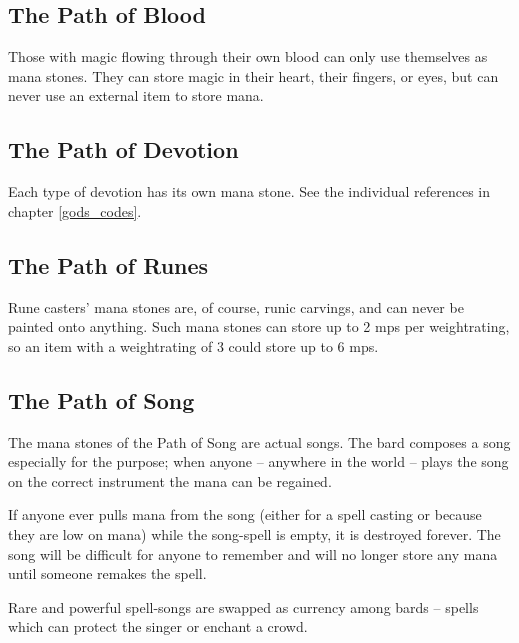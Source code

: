\begin{multicols}{2}
\subsection{The Path of Blood}


Those with magic flowing through their own blood can only use themselves as mana stones.
They can store magic in their heart, their fingers, or eyes, but can never use an external item to store mana.

\subsection{The Path of Devotion}


Each type of devotion has its own mana stone.
See the individual references in chapter \ref{gods_codes}.

\subsection{The Path of Runes}


Rune casters' mana stones are, of course, runic carvings, and can never be painted onto anything.
Such mana stones can store up to 2 \glspl{mp} per \gls{weightrating}, so an item with a \gls{weightrating} of 3 could store up to 6 \glspl{mp}.

\subsection{The Path of Song}
\label{song}

The mana stones of the Path of Song are actual songs.
The bard composes a song especially for the purpose; when anyone -- anywhere in the world -- plays the song on the correct instrument the mana can be regained.

If anyone ever pulls mana from the song (either for a spell casting or because they are low on mana) while the song-spell is empty, it is destroyed forever.
The song will be difficult for anyone to remember and will no longer store any mana until someone remakes the spell.

Rare and powerful spell-songs are swapped as currency among bards -- spells which can protect the singer or enchant a crowd.


\end{multicols}

